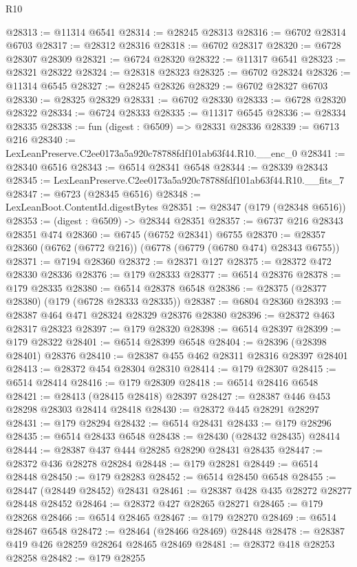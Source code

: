 \begin{lexlean}{R10}
\begin{coremodule}
@28313 := @11314 @6541
@28314 := @28245 @28313
@28316 := @6702 @28314 @6703
@28317 := @28312 @28316
@28318 := @6702 @28317
@28320 := @6728 @28307 @28309
@28321 := @6724 @28320
@28322 := @11317 @6541
@28323 := @28321 @28322
@28324 := @28318 @28323
@28325 := @6702 @28324
@28326 := @11314 @6545
@28327 := @28245 @28326
@28329 := @6702 @28327 @6703
@28330 := @28325 @28329
@28331 := @6702 @28330
@28333 := @6728 @28320 @28322
@28334 := @6724 @28333
@28335 := @11317 @6545
@28336 := @28334 @28335
@28338 := fun (digest : @6509) => @28331 @28336
@28339 := @6713 @216
@28340 := LexLeanPreserve.C2ee0173a5a920c78788fdf101ab63f44.R10.__enc_0
@28341 := @28340 @6516
@28343 := @6514 @28341 @6548
@28344 := @28339 @28343
@28345 := LexLeanPreserve.C2ee0173a5a920c78788fdf101ab63f44.R10.__fits_7
@28347 := @6723 (@28345 @6516)
@28348 := LexLeanBoot.ContentId.digestBytes
@28351 := @28347 (@179 (@28348 @6516))
@28353 := (digest : @6509) -> @28344 @28351
@28357 := @6737 @216 @28343 @28351 @474
@28360 := @6745 (@6752 @28341) @6755
@28370 := @28357 @28360 (@6762 (@6772 @216)) (@6778 (@6779 (@6780 @474) @28343 @6755))
@28371 := @7194 @28360
@28372 := @28371 @127
@28375 := @28372 @472 @28330 @28336
@28376 := @179 @28333
@28377 := @6514 @28376
@28378 := @179 @28335
@28380 := @6514 @28378 @6548
@28386 := @28375 (@28377 @28380) (@179 (@6728 @28333 @28335))
@28387 := @6804 @28360
@28393 := @28387 @464 @471 @28324 @28329 @28376 @28380
@28396 := @28372 @463 @28317 @28323
@28397 := @179 @28320
@28398 := @6514 @28397
@28399 := @179 @28322
@28401 := @6514 @28399 @6548
@28404 := @28396 (@28398 @28401) @28376
@28410 := @28387 @455 @462 @28311 @28316 @28397 @28401
@28413 := @28372 @454 @28304 @28310
@28414 := @179 @28307
@28415 := @6514 @28414
@28416 := @179 @28309
@28418 := @6514 @28416 @6548
@28421 := @28413 (@28415 @28418) @28397
@28427 := @28387 @446 @453 @28298 @28303 @28414 @28418
@28430 := @28372 @445 @28291 @28297
@28431 := @179 @28294
@28432 := @6514 @28431
@28433 := @179 @28296
@28435 := @6514 @28433 @6548
@28438 := @28430 (@28432 @28435) @28414
@28444 := @28387 @437 @444 @28285 @28290 @28431 @28435
@28447 := @28372 @436 @28278 @28284
@28448 := @179 @28281
@28449 := @6514 @28448
@28450 := @179 @28283
@28452 := @6514 @28450 @6548
@28455 := @28447 (@28449 @28452) @28431
@28461 := @28387 @428 @435 @28272 @28277 @28448 @28452
@28464 := @28372 @427 @28265 @28271
@28465 := @179 @28268
@28466 := @6514 @28465
@28467 := @179 @28270
@28469 := @6514 @28467 @6548
@28472 := @28464 (@28466 @28469) @28448
@28478 := @28387 @419 @426 @28259 @28264 @28465 @28469
@28481 := @28372 @418 @28253 @28258
@28482 := @179 @28255

\end{coremodule}
\end{lexlean}
